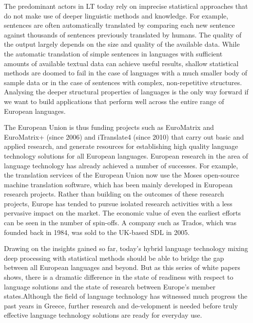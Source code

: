 \documentclass[]{../../metanetpaper}
\begin{document}
\begin{multicols}{2}
The predominant actors in LT today rely on imprecise statistical approaches that do not make use of deeper linguistic methods and knowledge. For example, sentences are often automatically translated by comparing each new sentence against thousands of sentences previously translated by humans. The quality of the output largely depends on the size and quality of the available data. While the automatic translation of simple sentences in languages with sufficient amounts of available textual data can achieve useful results, shallow statistical methods are doomed to fail in the case of languages with a much smaller body of sample data or in the case of sentences with complex, non-repetitive structures. Analysing the deeper structural properties of languages is the only way forward if we want to build applications that perform well across the entire range of European languages.


The European Union is thus funding projects such as EuroMatrix and EuroMatrix+ (since 2006) and iTranslate4 (since 2010) that carry out basic and applied research, and generate resources for establishing high quality language technology solutions for all European languages. 
European research in the area of language technology has already achieved a number of successes. For example, the translation services of the European Union now use the Moses open-source machine translation software, which has been mainly developed in European research projects. Rather than building on the outcomes of these research projects, Europe has tended to pursue isolated research activities with a less pervasive impact on the market. The economic value of even the earliest efforts can be seen in the number of spin-offs. A company such as Trados, which was founded back in 1984, was sold to the UK-based SDL in 2005.


Drawing on the insights gained so far, today’s hybrid language technology mixing deep processing with statistical methods should be able to bridge the gap between all European languages and beyond. But as this series of white papers shows, there is a dramatic difference in the state of readiness with respect to language solutions and the state of research between Europe’s member states.Although the field of language technology has witnessed much progress the past years in Greece, further research and de-velopment is needed before truly effective language technology solutions are ready for everyday use. 


\end{multicols}
\end{document}
